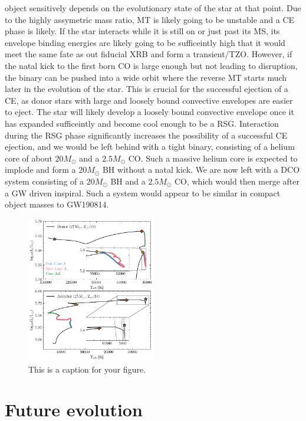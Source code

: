 \documentclass[linenumbers,trackchanges,twocolumn]{aastex701}
\newcommand{\Mdot}{M_{\odot}}
\begin{document}
object sensitively depends on the evolutionary state of the star at that point. Due to the highly assymetric mass ratio, MT is likely going to be unstable and a CE phase is likely. If the star interacts while it is still on or just past its MS, its envelope binding energies are likely going to be sufficeintly high that it would meet the same fate as out fiducial XRB and form a transient/TZO. However, if the natal kick to the first born CO is large enough but not leading to disruption, the binary can be pushed into a wide orbit where the reverse MT starts much later in the evolution of the star. This is crucial for the successful ejection of a CE, as donor stars with large and loosely bound convective envelopes are easier to eject. The star will likely develop a loosely bound convective envelope once it has expanded sufficeintly and become cool enough to be a RSG. Interaction during the RSG phase significantly increases the possibility of a successful CE ejection, and we would be left behind with a tight binary, consisting of a helium core of about $20\Mdot$ and a $2.5\Mdot$ CO. Such a massive helium core is expected to implode and form a $20\Mdot$ BH without a natal kick. We are now left with a DCO system consisting of a $20\Mdot$ BH and a $2.5\Mdot$ CO, which would then merge after a GW driven inspiral. Such a system would appear to be similar in compact object masses to GW190814. 

\begin{figure}[htbp]
    \centering
    \includegraphics[width=0.5\textwidth]{gw_fiducial_hr.pdf}
    \caption{This is a caption for your figure.}
    \label{fig:gw_hr}
\end{figure}

\section{Future evolution}
\end{document}
